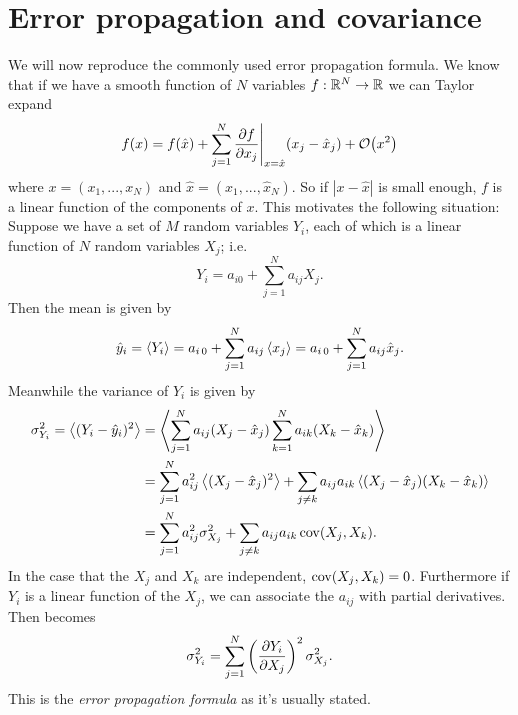 \section{Error propagation and covariance}\label{sec:prop}
We will now reproduce the commonly used error propagation formula. We know
that if we have a smooth function of $N$ variables 
$f:\mathbb{R}^N\to\mathbb{R}$ we can Taylor expand
\begin{equation}
  f(x)=f(\hat{x})+\sum_{j=1}^N
        \pdv{f}{x_j}\Bigg|_{x=\hat{x}}(x_j-\hat{x}_j)
        +\order{x^2}
\end{equation}
where $x=(x_1,...,x_N)$ and $\hat{x}=(\hat{x}_1,...,\hat{x}_N)$. So if 
$|x-\hat{x}|$ is small enough, $f$ is a linear function of the components 
of $x$. This motivates the following situation: Suppose we have a set of 
$M$ random variables $Y_i$, each of which is a linear function of $N$ 
random variables $X_j$; i.e.
\begin{equation}\label{eq:lintran}
  Y_i=a_{i0}+\sum_{j=1}^N a_{ij}X_j.
\end{equation}
Then the mean is given by
\begin{equation}
  \hat{y}_i=\ev{Y_i}=a_{i\,0}+\sum_{j=1}^N a_{ij}\ev{x_j}
           =a_{i\,0}+\sum_{j=1}^N a_{ij}\hat{x}_j.
\end{equation}
Meanwhile the variance of $Y_i$ is given by
\begin{equation}\label{eq:linprop}
  \begin{aligned}
    \sigma^2_{Y_i}=\ev{(Y_i-\hat{y}_i)^2}
              &=\ev{\sum_{j=1}^N a_{ij}(X_j-\hat{x}_j)
                   \sum_{k=1}^N a_{ik}(X_k-\hat{x}_k)}\\
              &=\sum_{j=1}^N a_{ij}^2\ev{(X_j-\hat{x}_j)^2}
               +\sum_{j\neq k}a_{ij}a_{ik}
                \ev{(X_j-\hat{x}_j)(X_k-\hat{x}_k)}\\
              &=\sum_{j=1}^N a_{ij}^2\sigma^2_{X_j}
               +\sum_{j\neq k}a_{ij}a_{ik}\Cov(X_j,X_k).
  \end{aligned}
\end{equation}
In the case that the $X_j$ and $X_k$ are independent, $\operatorname{cov}(X_j,X_k)=0$.
Furthermore if $Y_i$ is a linear function of the $X_j$, we 
can associate the $a_{ij}$ with partial derivatives. Then 
 becomes
\begin{equation}\label{eq:errprop}\index{error propagation formula}
  \sigma^2_{Y_i}=
   \sum_{j=1}^N\left(\pdv{Y_i}{X_j}\right)^2\sigma_{X_j}^2.
\end{equation}
This is the {\it error propagation formula} as it's usually stated. 
